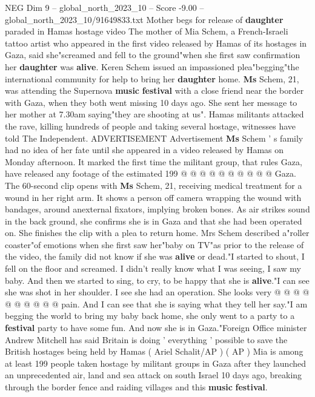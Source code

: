 \begin{textsample}{NEG Dim 9 – global\_north\_2023\_10 – Score -9.00 – global\_north\_2023\_10/91649833.txt}  \label{ex:f9_neg_034}
Mother begs for release of \textbf{daughter} paraded in Hamas hostage video The mother of Mia Schem, a French-Israeli tattoo artist who appeared in the first video released by Hamas of its hostages in Gaza, said she"screamed and fell to the ground"when she first saw confirmation her \textbf{daughter} was \textbf{alive}.
Keren Schem issued an impassioned plea"begging"the international community for help to bring her \textbf{daughter} home. \textbf{Ms} Schem, 21, was attending the Supernova \textbf{music} \textbf{festival} with a close friend near the border with Gaza, when they both went missing 10 days ago.
She sent her message to her mother at 7.30am saying"they are shooting at us".
Hamas militants attacked the rave, killing hundreds of people and taking several hostage, witnesses have told The Independent.
ADVERTISEMENT Advertisement \textbf{Ms} Schem ' s family had no idea of her fate until she appeared in a video released by Hamas on Monday afternoon.
It marked the first time the militant group, that rules Gaza, have released any footage of the estimated 199 @ @ @ @ @ @ @ @ @ @ Gaza.
The 60-second clip opens with \textbf{Ms} Schem, 21, receiving medical treatment for a wound in her right arm.
It shows a person off camera wrapping the wound with bandages, around anexternal fixators, implying broken bones.
As air strikes sound in the back ground, she confirms she is in Gaza and that she had been operated on.
She finishes the clip with a plea to return home.
Mrs Schem described a"roller coaster"of emotions when she first saw her"baby on TV"as prior to the release of the video, the family did not know if she was \textbf{alive} or dead."I started to shout, I fell on the floor and screamed.
I didn't really know what I was seeing, I saw my baby.
And then we started to sing, to cry, to be happy that she is \textbf{alive}."I can see she was shot in her shoulder.
I see she had an operation.
She looks very @ @ @ @ @ @ @ @ @ @ pain.
And I can see that she is saying what they tell her say."I am begging the world to bring my baby back home, she only went to a party to a \textbf{festival} party to have some fun.
And now she is in Gaza."Foreign Office minister Andrew Mitchell has said Britain is doing ' everything ' possible to save the British hostages being held by Hamas ( Ariel Schalit/AP ) ( AP ) Mia is among at least 199 people taken hostage by militant groups in Gaza after they launched an unprecedented air, land and sea attack on south Israel 10 days ago, breaking through the border fence and raiding villages and this \textbf{music} \textbf{festival}.

\end{textsample}

